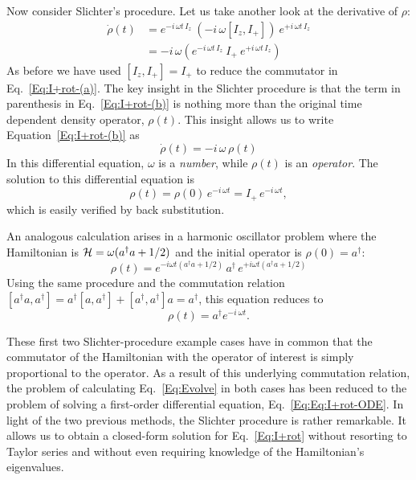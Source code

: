  Now consider Slichter's procedure. Let us take another look at the derivative of $\rho$:
\begin{subequations}  
\begin{align}
\dot{\rho}(t)
	& = e^{-i \, \omega t \, I_z} \: 
		(-i \, \omega [I_z,I_{+}] ) 
		\: e^{+i \, \omega t \, I_z} 
		\label{Eq:I+rot-(a)} \\
	& = -i \, \omega \left( 
			e^{-i \, \omega t \, I_z} \: I_{+} \: e^{+i \, \omega t \, I_z} 
		\right)
		\label{Eq:I+rot-(b)}
\end{align}
\end{subequations} 
As before we have used $[I_z,I_{+}] = I_{+}$ to reduce the commutator in Eq.~\ref{Eq:I+rot-(a)}.  The key insight in the Slichter procedure is that the term in parenthesis in Eq.~\ref{Eq:I+rot-(b)} is nothing more than the original time dependent density operator, $\rho(t)$.  This insight allows us to write Equation~\ref{Eq:I+rot-(b)} as
\begin{equation}
\dot{\rho}(t) 
	= -i \, \omega \, \rho(t)
	\label{Eq:Eq:I+rot-ODE}
\end{equation}
In this differential equation, $\omega$ is a \emph{number}, while $\rho(t)$ is an \emph{operator}.  The solution to this differential equation is
\begin{equation}
\rho(t) 
	= \rho(0) \, e^{-i \, \omega t}
 	= I_{+} \, e^{-i \, \omega t},
	\label{Eq:I+rot-soln}
\end{equation}
which is easily verified by back substitution. 

 An analogous calculation arises in a harmonic oscillator problem where the Hamiltonian is ${\cal H} = \omega (a^{\dagger} a + 1/2)$ and the initial operator is $\rho(0) = a^{\dagger}$: 
\begin{equation}
\rho(t) 
	= e^{-i \omega t (a^{\dagger} a + 1/2)} 
		\, a^{\dagger} 
		\, e^{+i \omega t (a^{\dagger} a + 1/2)}
		\label{Eq:adaggerrot-soln}
\end{equation}
Using the same procedure and the commutation relation $[a^{\dagger} a,a^{\dagger}] = a^{\dagger} [a, a^{\dagger}] + [a^{\dagger}, a^{\dagger}] a = a^{\dagger}$, this equation reduces to 
\begin{equation}
	\rho(t)  = a^{\dagger} e^{-i \: \omega t}.
\end{equation}

These first two Slichter-procedure example cases have in common that the commutator of the Hamiltonian with the operator of interest is simply proportional to the operator. As a result of this underlying commutation relation, the problem of calculating Eq.~\ref{Eq:Evolve} in both cases has been reduced to the problem of solving a first-order differential equation, Eq.~\ref{Eq:Eq:I+rot-ODE}.  In light of the two previous methods, the Slichter procedure is rather remarkable.  It allows us to obtain a closed-form solution for Eq.~\ref{Eq:I+rot} without resorting to Taylor series and without even requiring knowledge of the Hamiltonian's eigenvalues.    

